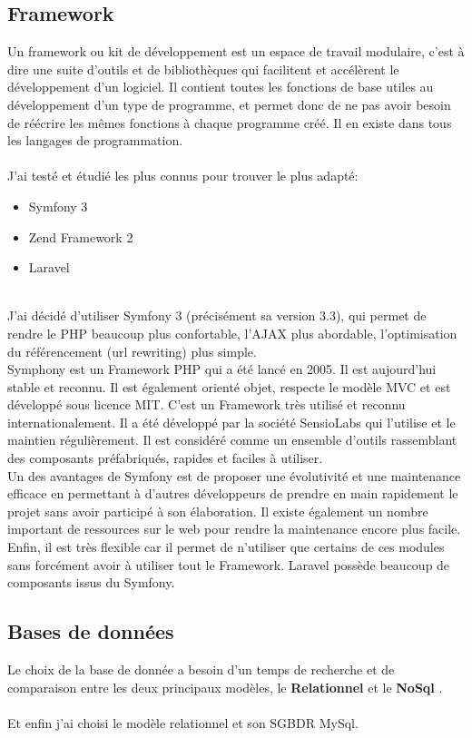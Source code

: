 \documentclass[12pt]{article}
\begin{document}
\subsection{Framework }
Un framework ou kit de développement est un espace de travail modulaire, c'est à dire
une suite d'outils et de bibliothèques qui facilitent et accélèrent le développement d'un
logiciel. Il contient toutes les fonctions de base utiles au développement d'un type de
programme, et permet donc de ne pas avoir besoin de réécrire les mêmes fonctions à
chaque programme créé. Il en existe dans tous les langages de programmation.\\ \\
J'ai testé et étudié les plus connus pour trouver le plus adapté:
\begin{itemize}
\item Symfony 3
\item Zend Framework 2
\item Laravel
\end{itemize} \\

 J'ai décidé d'utiliser Symfony 3 (précisément sa version 3.3), qui permet de  rendre le PHP beaucoup plus
confortable, l'AJAX plus abordable, l'optimisation du référencement (url rewriting) plus
simple.\\
Symphony est un Framework PHP qui a été lancé en 2005. Il est aujourd’hui stable et reconnu.
Il est également orienté objet, respecte le modèle MVC et est développé sous licence MIT.
C’est un Framework très utilisé et reconnu internationalement. Il a été développé par la société
SensioLabs qui l’utilise et le maintien régulièrement.
Il est considéré comme un ensemble d’outils rassemblant des composants préfabriqués,
rapides et faciles à utiliser.\\
Un des avantages de Symfony est de proposer une évolutivité et une maintenance efficace en
permettant à d’autres développeurs de prendre en main rapidement le projet sans avoir
participé à son élaboration. Il existe également un nombre important de ressources sur le web
pour rendre la maintenance encore plus facile. Enfin, il est très flexible car il permet de n’utiliser
que certains de ces modules sans forcément avoir à utiliser tout le Framework. Laravel
possède beaucoup de composants issus du Symfony.


\subsection{Bases de données}
 Le choix de la base de donnée  a besoin  d'un temps de recherche et de comparaison entre les deux principaux modèles, le 
  \textbf{Relationnel} et le \textbf{NoSql} . \\
   \\
Et enfin j'ai choisi le modèle relationnel et son SGBDR MySql.\\
\end{document}
